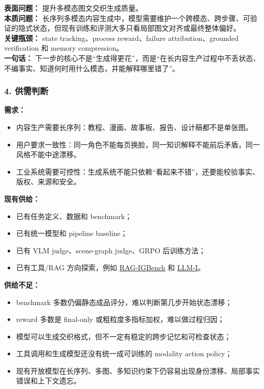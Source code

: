 \begin{summarybox}
\textbf{表面问题：} 提升多模态图文交织生成质量。\\
\textbf{本质问题：} 长序列多模态内容生成中，模型需要维护一个跨模态、跨步骤、可验证的隐式状态，但现有训练和评测大多只看局部图文对齐或最终整体偏好。\\
\textbf{关键瓶颈：} state tracking、process reward、failure attribution、grounded verification 和 memory compression。\\
\textbf{一句话：} 下一步的核心不是“生成得更花”，而是“在长内容生产过程中不丢状态、不编事实、知道何时用什么模态，并能解释哪里错了”。
\end{summarybox}

\subsubsection*{4. 供需判断}

\textbf{需求：}

\begin{itemize}[leftmargin=1.5em]
  \item 内容生产需要长序列：教程、漫画、故事板、报告、设计稿都不是单张图。
  \item 用户要求一致性：同一角色不能每页换脸，同一知识解释不能前后矛盾，同一风格不能中途漂移。
  \item 工业系统需要可控性：生成系统不能只依赖“看起来不错”，还要能校验事实、版权、来源和安全。
\end{itemize}

\textbf{现有供给：}

\begin{itemize}[leftmargin=1.5em]
  \item 已有任务定义、数据和 benchmark；
  \item 已有统一模型和 pipeline baseline；
  \item 已有 VLM judge、scene-graph judge、GRPO 后训练方法；
  \item 已有工具/RAG 方向探索，例如 \href{https://arxiv.org/abs/2512.05119}{RAG-IGBench} 和 \href{https://arxiv.org/abs/2509.13642}{LLM-I}。
\end{itemize}

\textbf{供给不足：}

\begin{itemize}[leftmargin=1.5em]
  \item benchmark 多数仍偏静态成品评分，难以判断第几步开始状态漂移；
  \item reward 多数是 final-only 或粗粒度多指标加权，难以做过程归因；
  \item 模型可以生成交织格式，但不一定有稳定的跨步记忆和可检查状态；
  \item 工具调用和生成模型还没有统一成可训练的 modality action policy；
  \item 现有开放模型在长序列、多图、多知识约束下仍容易出现身份漂移、局部事实错误和上下文遗忘。
\end{itemize}

